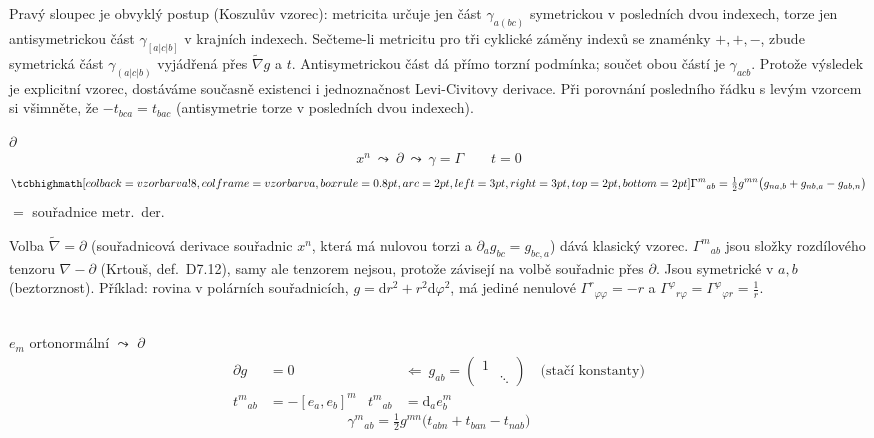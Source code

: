 \begin{vysvetleni}
Pravý sloupec je obvyklý postup (Koszulův vzorec): metricita určuje jen část $\gamma_{a(bc)}$ symetrickou v posledních dvou indexech, torze jen antisymetrickou část $\gamma_{[a|c|b]}$ v krajních indexech. Sečteme-li metricitu pro tři cyklické záměny indexů se znaménky $+,+,-$, zbude symetrická část $\gamma_{(a|c|b)}$ vyjádřená přes $\tilde\nabla g$ a $t$. Antisymetrickou část dá přímo torzní podmínka; součet obou částí je $\gamma_{acb}$.
Protože výsledek je explicitní vzorec, dostáváme současně existenci i jednoznačnost Levi-Civitovy derivace. Při porovnání posledního řádku s levým vzorcem si všimněte, že $-t_{bca}=t_{bac}$ (antisymetrie torze v posledních dvou indexech).
\end{vysvetleni}

 $\partial$
\[
  x^n \ \leadsto\ \partial \ \leadsto\ \gamma = \Gamma \qquad t = 0
\]
\[
  \vzorec{\Gamma^m{}_{ab} = \tfrac12 g^{mn}\big(g_{na,b} + g_{nb,a} - g_{ab,n}\big)}
\]
\quad {} $=$ souřadnice metr.\ der.

\begin{vysvetleni}
Volba $\tilde\nabla=\partial$ (souřadnicová derivace souřadnic $x^n$, která má nulovou torzi a $\partial_ag_{bc}=g_{bc,a}$) dává klasický vzorec. $\Gamma^m{}_{ab}$ jsou složky rozdílového tenzoru $\nabla-\partial$ (Krtouš, def.~D7.12), samy ale tenzorem nejsou, protože závisejí na volbě souřadnic přes $\partial$. Jsou symetrické v $a,b$ (beztorznost).
Příklad: rovina v polárních souřadnicích, $g=\mathrm{d}r^2+r^2\mathrm{d}\varphi^2$, má jediné nenulové $\Gamma^r{}_{\varphi\varphi}=-r$ a $\Gamma^\varphi{}_{r\varphi}=\Gamma^\varphi{}_{\varphi r}=\frac1r$.
\end{vysvetleni}

  \\
\quad $e_m$ ortonormální $\leadsto$ $\partial$
\begin{align*}
  \partial g &= 0 & &\Leftarrow\ g_{ab} = \begin{pmatrix}1 & \\ & \ddots\end{pmatrix} \quad \text{(stačí konstanty)} \\
  t^m{}_{ab} &= -[e_a,e_b]^m & t^m{}_{ab} &= \mathrm{d}_a e^m_b
\end{align*}
\[
  \gamma^m{}_{ab} = \tfrac12 g^{mn}\big(t_{abn} + t_{ban} - t_{nab}\big)
\]
\quad {}

